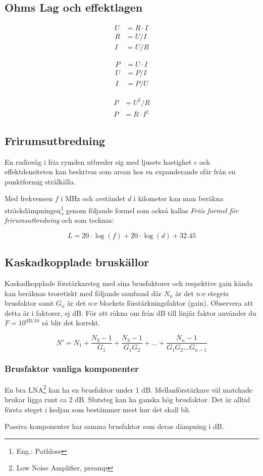\documentclass[12pt,swedish,a4paper]{article}
\begin{document}
\subsection{Ohms Lag och effektlagen}

\begin{align}
U &= R\cdot I\\
R &= U/I\\
I &= U/R
\end{align}

\begin{align}
P &= U \cdot I\\
U &= P/I\\
I &= P/U
\end{align}

\begin{align}
P &= U^2/R\\
P &= R \cdot I^2
\end{align}

\subsection{Frirumsutbredning}

En radiovåg i fria rymden utbreder sig med ljusets hastighet $c$ och effektdensiteten kan beskrivas som arean hos en expanderande sfär från en punktformig strålkälla.

Med frekvensen $f$ i MHz och avståndet $d$ i kilometer kan man beräkna sträck\-dämp\-ning\-en\footnote{Eng.: Pathloss} genom följande formel som också kallas \emph{Friis formel för frirumsutbredning} och som tecknas:

\begin{equation}
L=20\cdot \log(f) + 20\cdot \log(d) +32.45
\end{equation}

\subsection{Kaskadkopplade bruskällor}

Kaskadkopplade förstärkarsteg med sina brusfaktorer och respektive gain kända kan beräknas teoretiskt med följande samband där $N_n$ är det $n$:e stegets brusfaktor samt $G_n$ är det $n$:e blockets förstärkningsfaktor (gain). Observera att detta är i faktorer, ej dB. För att räkna om från dB till linjär faktor använder du $F=10^{\mathrm{dB}/10}$ så blir det korrekt.

\begin{equation}
N'=N_1+\frac{N_2-1}{G_1} + \frac{N_3-1}{G_1G_2} + ... + \frac{N_n-1}{G_1G_2...G_{n-1}}
\end{equation}

\subsubsection{Brusfaktor vanliga komponenter}

En bra LNA\footnote{Low Noise Amplifier, preamp} kan ha en brusfaktor under 1 dB. Mellanförstärkare väl matchade brukar ligga runt ca 2 dB. Slutsteg kan ha ganska hög brusfaktor. Det är alltid första steget i kedjan som bestämmer mest hur det skall bli.

Passiva komponenter har samma brusfaktor som deras dämpning i dB.
\end{document}
